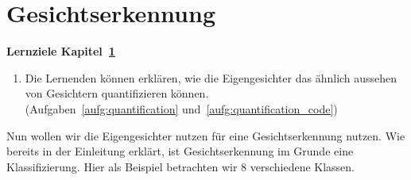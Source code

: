 \section{Gesichtserkennung} \label{sec:recognition}
\begin{tcolorbox}
	\centerline{\textbf{Lernziele Kapitel~\ref{sec:recognition}}}
	\begin{enumerate}[leftmargin=*,label=\thesection.\arabic*]
		\item \label{item:recognition} Die Lernenden können erklären, wie die Eigengesichter das \glqq{}ähnlich aussehen\grqq{} von Gesichtern quantifizieren können.\\
		(Aufgaben~\ref{aufg:quantification} und~\ref{aufg:quantification_code})
	\end{enumerate}
\end{tcolorbox}
Nun wollen wir die Eigengesichter nutzen für eine Gesichtserkennung nutzen.
Wie bereits in der Einleitung erklärt, ist Gesichtserkennung im Grunde eine Klassifizierung.
Hier als Beispiel betrachten wir 8 verschiedene Klassen.

